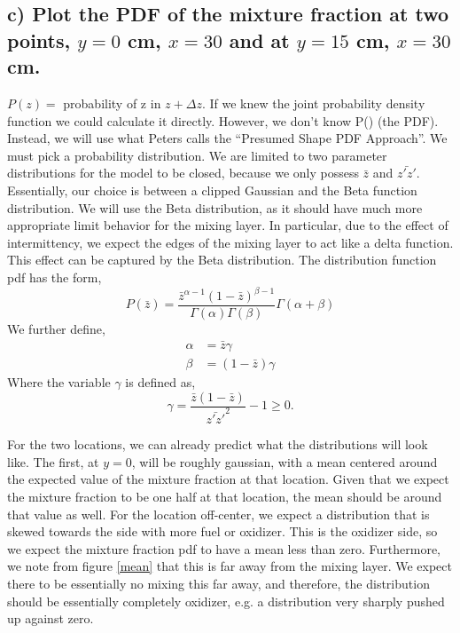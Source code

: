 \documentclass{article}
\begin{document}
\subsection*{c) Plot the PDF of the mixture fraction at two points, $y=0$ cm,
$x=30$ and at $y=15$ cm, $x=30$ cm.}

$P(z) =$ probability of z in $z+\Delta z$. If we knew the joint
probability density function we could calculate it directly. However, we
don't know P() (the PDF). Instead, we will use  what Peters calls the
``Presumed Shape PDF Approach''. We must pick a probability
distribution. We are limited to two parameter distributions for the
model to be closed, because we only possess  $\bar z$ and
$\bar{z'z'}$. Essentially, our choice is between a clipped Gaussian and
the Beta  function distribution. We will use the Beta distribution, as
it should have much more appropriate  limit behavior for the mixing
layer. In particular, due to the effect of intermittency, we expect the
edges of the mixing layer to act like a delta function. This effect can
be captured by the Beta distribution. The distribution function pdf has
the form,  
\begin{equation}
P(\bar z) = \frac{\bar z^{\alpha-1}(1-\bar z)^{\beta-1}}{\Gamma(\alpha)\Gamma(\beta)}\Gamma(\alpha + \beta)
\end{equation}
We further define,
\begin{align}
\alpha &= \bar z \gamma \\
\beta  &= (1-\bar z) \gamma
\end{align}
Where the variable $\gamma$ is defined as, 
\begin{equation}
  \gamma = \frac{\bar z (1-\bar z)}{\bar{z'z'}^2} -1 \geq 0.
\end{equation}

For the two locations, we can already predict what the distributions
will look like. The first, at $y=0$, will be roughly gaussian, with a
mean centered around the expected value of the mixture fraction at that
location. Given that we expect the mixture fraction to be one half at that
location, the mean should be around that value as well. For the location
off-center, we expect a distribution that is skewed towards the side
with more fuel or oxidizer. This is the oxidizer side, so we expect the
mixture fraction pdf to have a mean less than zero. Furthermore, we note
from figure \ref{mean} that this is far away from the mixing layer. We
expect there to be essentially no mixing this far away, and therefore,
the distribution should be essentially completely oxidizer, e.g. a
distribution very sharply pushed up against zero. 
\end{document}
